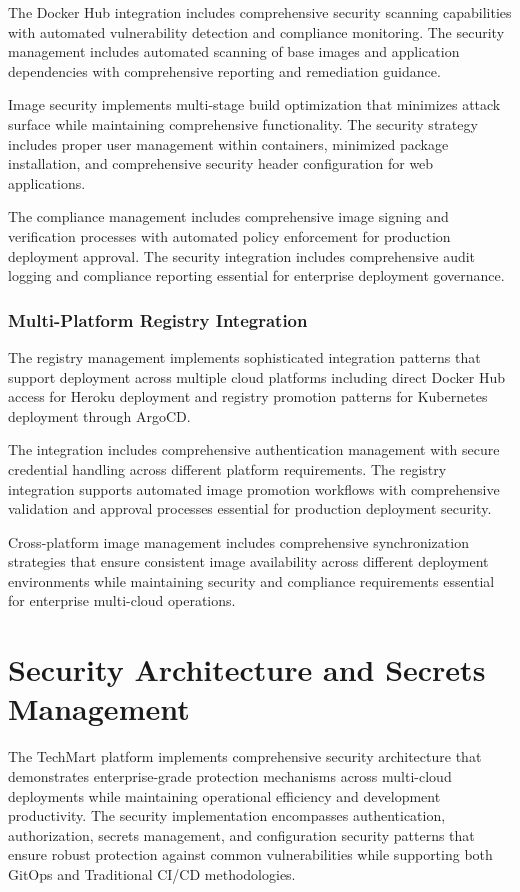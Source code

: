 The Docker Hub integration includes comprehensive security scanning capabilities with automated vulnerability detection and compliance monitoring. The security management includes automated scanning of base images and application dependencies with comprehensive reporting and remediation guidance.

Image security implements multi-stage build optimization that minimizes attack surface while maintaining comprehensive functionality. The security strategy includes proper user management within containers, minimized package installation, and comprehensive security header configuration for web applications.

The compliance management includes comprehensive image signing and verification processes with automated policy enforcement for production deployment approval. The security integration includes comprehensive audit logging and compliance reporting essential for enterprise deployment governance.

\subsubsection{Multi-Platform Registry Integration}

The registry management implements sophisticated integration patterns that support deployment across multiple cloud platforms including direct Docker Hub access for Heroku deployment and registry promotion patterns for Kubernetes deployment through ArgoCD.

The integration includes comprehensive authentication management with secure credential handling across different platform requirements. The registry integration supports automated image promotion workflows with comprehensive validation and approval processes essential for production deployment security.

Cross-platform image management includes comprehensive synchronization strategies that ensure consistent image availability across different deployment environments while maintaining security and compliance requirements essential for enterprise multi-cloud operations.


\section{Security Architecture and Secrets Management}

The TechMart platform implements comprehensive security architecture that demonstrates enterprise-grade protection mechanisms across multi-cloud deployments while maintaining operational efficiency and development productivity. The security implementation encompasses authentication, authorization, secrets management, and configuration security patterns that ensure robust protection against common vulnerabilities while supporting both GitOps and Traditional CI/CD methodologies.

